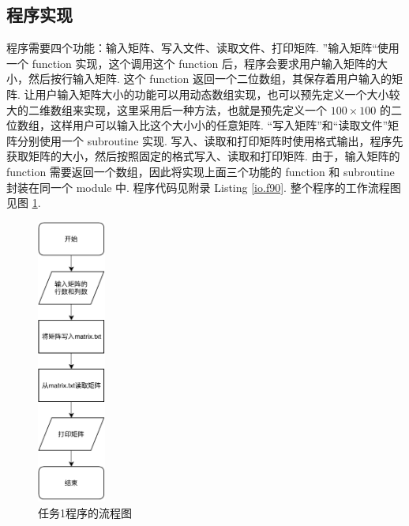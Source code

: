 \documentclass{article}
\begin{document}
	\subsection{程序实现}
	程序需要四个功能：输入矩阵、写入文件、读取文件、打印矩阵. ”输入矩阵“使用一个 function 实现，这个调用这个 function 后，程序会要求用户输入矩阵的大小，然后按行输入矩阵. 这个 function 返回一个二位数组，其保存着用户输入的矩阵. 让用户输入矩阵大小的功能可以用动态数组实现，也可以预先定义一个大小较大的二维数组来实现，这里采用后一种方法，也就是预先定义一个 $100\times100$ 的二位数组，这样用户可以输入比这个大小小的任意矩阵. “写入矩阵”和“读取文件”矩阵分别使用一个 subroutine 实现. 写入、读取和打印矩阵时使用格式输出，程序先获取矩阵的大小，然后按照固定的格式写入、读取和打印矩阵. 由于，输入矩阵的 function 需要返回一个数组，因此将实现上面三个功能的 function 和 subroutine 封装在同一个 module 中. 程序代码见附录 Listing \ref{io.f90}. 整个程序的工作流程图见图 \ref{fig:io}.
	\begin{figure}[h!tb]
		\centering
		\includegraphics[width=0.2\textwidth]{./utils/io.pdf}
		\caption{ 任务1程序的流程图\label{fig:io}}
	\end{figure}
\end{document}
